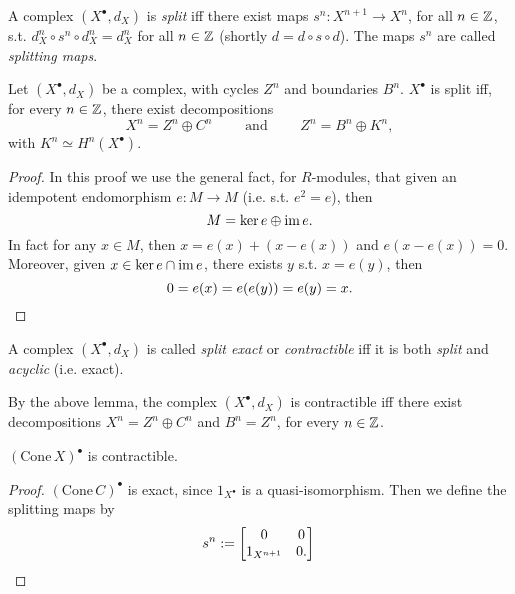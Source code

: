 \begin{defn}
	A complex $\left( X^{\bullet}, d_{X} \right)$ is {\em split} iff there exist
	maps $s^n: X^{n+1} \to X^n$, for all $n \in \mathbb{Z}$, s.t.
	$d^n_X \circ s^n \circ d^n_X = d^n_X$ for all $n \in \mathbb{Z}$ (shortly $d = d \circ s \circ d$).
	The maps $s^n$ are called {\em splitting maps}.
\end{defn}

\begin{lem}
	Let $\left( X^{\bullet}, d_{X} \right)$ be a complex, with cycles $Z^n$ and
	boundaries $B^n$.
	$X^\bullet$ is split iff, for every $n \in \mathbb{Z}$, there
	exist decompositions
	\begin{equation}
	X^n = Z^n \oplus C^n \qquad \text{ and } \qquad
	Z^n = B^n \oplus K^n
	,\end{equation} 
	with $K^n \simeq H^n(X^\bullet)$.
\end{lem} 
\begin{proof}
	In this proof we use the general fact, for $R$-modules, that given an idempotent
	endomorphism $e: M \to M$ (i.e. s.t. $e^2 = e$), then
	\begin{equation}
	M = \ker e \oplus \operatorname{im} e
	.\end{equation} 
	In fact for any $x \in M$, then $x = e(x) + (x - e(x))$ and
	$e(x - e(x)) = 0$.
	Moreover, given $x \in \ker e \cap \operatorname{im} e$, there exists $y$ s.t. $x = e(y)$, then
	\begin{equation*}
		0 = e(x) = e(e(y)) = e(y) = x.\qedhere
	\end{equation*} 
\end{proof}

\begin{defn}
	A complex $\left( X^{\bullet}, d_{X} \right)$ is called {\em split exact} or {\em contractible} iff
	it is both {\em split} and {\em acyclic} (i.e. exact).
\end{defn}

\begin{rem}[]
	By the above lemma, the complex $\left( X^{\bullet}, d_{X} \right)$ is contractible iff
	there exist decompositions $X^n = Z^n \oplus C^n$ and $B^n = Z^n$, for every $n \in \mathbb{Z}$.
\end{rem}

\begin{lem}
	$(\mathrm{Cone}\, X)^\bullet$ is contractible.
\end{lem} 
\begin{proof}
	$\left( \mathrm{Cone}\, C \right)^\bullet$ is exact, since $1_{X^\bullet}$ is a quasi-isomorphism.
	Then we define the splitting maps by
	\begin{equation*}
	s^n :=
	\begin{bmatrix}
		0 & 0\\
		1_{X^{n+1}} & 0.
	\end{bmatrix} \qedhere
	\end{equation*} 
\end{proof}


